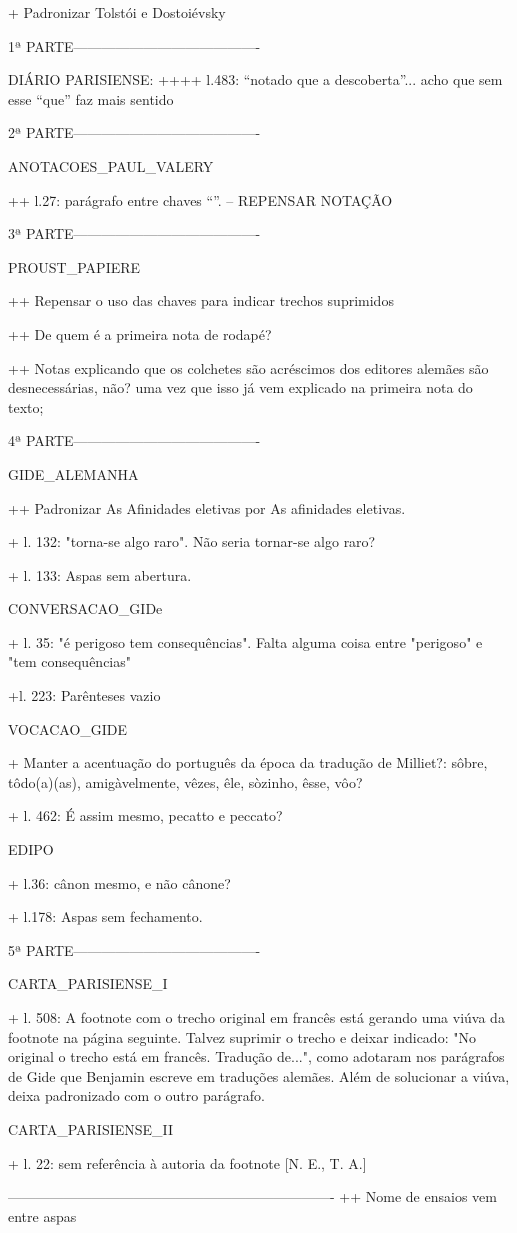 + Padronizar Tolstói e Dostoiévsky

1ª PARTE----------------------------------------

DIÁRIO PARISIENSE:
++++ l.483: ``notado que a descoberta''... acho que sem esse ``que'' faz mais sentido


2ª PARTE----------------------------------------


ANOTACOES_PAUL_VALERY

++ l.27: parágrafo entre chaves ``{}''. -- REPENSAR NOTAÇÃO

3ª PARTE----------------------------------------


PROUST_PAPIERE

++ Repensar o uso das chaves para indicar trechos suprimidos

++ De quem é a primeira nota de rodapé?

++ Notas explicando que os colchetes são acréscimos dos editores alemães são desnecessárias, não? uma vez que isso já vem explicado na primeira nota do texto;

4ª PARTE----------------------------------------

GIDE_ALEMANHA

++ Padronizar As Afinidades eletivas por As afinidades eletivas.

+ l. 132: "torna-se algo raro". Não seria tornar-se algo raro?

+ l. 133: Aspas sem abertura.

CONVERSACAO_GIDe

+ l. 35: "é perigoso tem consequências". Falta alguma coisa entre "perigoso" e "tem consequências"

+l. 223: Parênteses vazio

VOCACAO_GIDE

+ Manter a acentuação do português da época da tradução de Milliet?: sôbre, tôdo(a)(as), amigàvelmente, vêzes, êle, sòzinho, êsse, vôo?

+ l. 462: É assim mesmo, pecatto e peccato?

EDIPO

+ l.36: cânon mesmo, e não cânone?

+ l.178: Aspas sem fechamento.


5ª PARTE----------------------------------------

CARTA_PARISIENSE_I

+ l. 508: A footnote com o trecho original em francês está gerando uma viúva da footnote na página seguinte. Talvez suprimir o trecho e deixar indicado: "No original o trecho está em francês. Tradução de...", como adotaram nos parágrafos de Gide que Benjamin escreve em traduções alemães. Além de solucionar a viúva, deixa padronizado com o outro parágrafo.


CARTA_PARISIENSE_II

+ l. 22: sem referência à autoria da footnote [N. E., T. A.]



----------------------------------------------------------------------
++ Nome de ensaios vem entre aspas